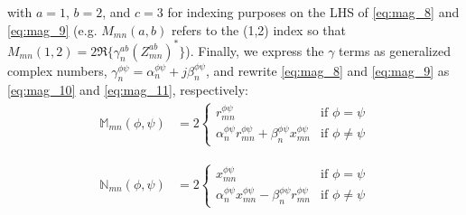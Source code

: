 \noindent with $a=1$, $b=2$, and $c=3$ for indexing purposes on the LHS of \eqref{eq:mag_8} and \eqref{eq:mag_9} (e.g. $M_{mn}(a,b)$ refers to the (1,2) index so that $M_{mn} (1,2) = 2 \Re \{ \gamma_{n}^{ab} {\left( Z_{mn}^{ab} \right)}^{*} \}$). Finally, we express the $\gamma$ terms as generalized complex numbers, $\gamma_{n}^{\phi \psi} = \alpha_{n}^{\phi \psi} + j\beta_{n}^{\phi \psi} $,
and rewrite \eqref{eq:mag_8} and \eqref{eq:mag_9} as \eqref{eq:mag_10} and \eqref{eq:mag_11}, respectively:
\begin{align}
	\mathbb{M}_{mn} (\phi, \psi) &= 2\begin{cases}
    	 r_{mn}^{\phi \psi} &\mbox{if } \phi = \psi \\
         \alpha_{n}^{\phi \psi} r_{mn}^{\phi \psi} + \beta_{n}^{\phi \psi} x_{mn}^{\phi \psi} &\mbox{if } \phi \ne \psi
    \end{cases} \label{eq:mag_10}
\end{align}

\begin{align}
	\mathbb{N}_{mn} (\phi, \psi) &= 2\begin{cases}
    	 x_{mn}^{\phi \psi} &\mbox{if } \phi = \psi \\
         \alpha_{n}^{\phi \psi} x_{mn}^{\phi \psi} - \beta_{n}^{\phi \psi} r_{mn}^{\phi \psi} &\mbox{if } \phi \ne \psi
    \end{cases} \label{eq:mag_11}
\end{align}





